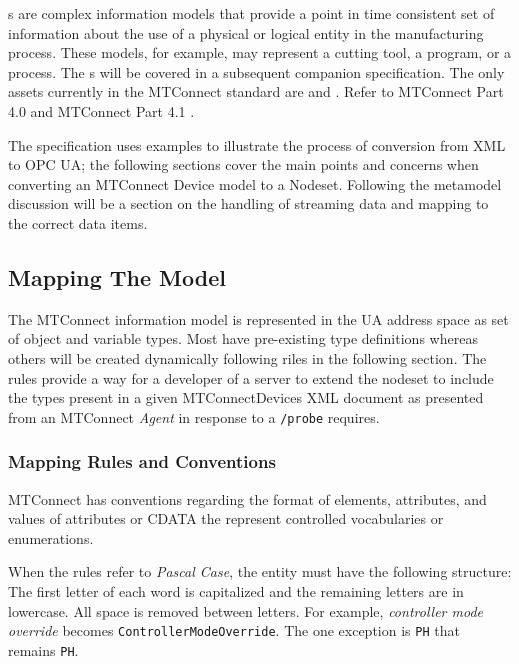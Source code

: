 s are complex information models that provide a point in time consistent set of information about the use of a physical or logical entity in the manufacturing process. These models, for example, may represent a cutting tool, a program, or a process. The s will be covered in a subsequent companion specification. The only assets currently in the MTConnect standard are  and . Refer to MTConnect Part 4.0 \cite{MTCPart40} and MTConnect Part 4.1 \cite{MTCPart41}.

The specification uses examples to illustrate the process of conversion from XML to OPC UA; the following sections cover the main points and concerns when converting an MTConnect Device model to a Nodeset. Following the metamodel discussion will be a section on the handling of streaming data and mapping to the correct data items. 

\subsection{Mapping The Model}
\lstset{language=XML,numbers=left,xleftmargin=2em}

The MTConnect information model is represented in the UA address space as set of object and variable types. Most have pre-existing type definitions whereas others will be created dynamically following riles in the following section. The rules provide a way for a developer of a server to extend the nodeset to include the types present in a given MTConnectDevices XML document as presented from an MTConnect \textit{Agent} in response to a \texttt{/probe} requires.

\subsubsection{Mapping Rules and Conventions}

MTConnect has conventions regarding the format of elements, attributes, and values of attributes or CDATA the represent controlled vocabularies or enumerations. 

When the rules refer to \textit{Pascal Case}, the entity must have the following structure: The first letter of each word is capitalized and the remaining letters are in lowercase. All space is removed between letters. For example, \textit{controller mode override} becomes \texttt{Controller\-Mode\-Override}. The one exception is \texttt{PH} that remains \texttt{PH}.

